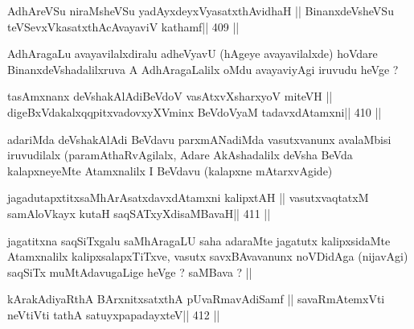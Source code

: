 \begin{shl}
\footnotemark[2]AdhAreVSu niraMsheVSu yadAyxdeyxVyasatxthAvidhaH ||
BinanxdeVsheVSu teVSevxVkasatxthAcAvayaviV kathamf\hfill || 409 ||
\end{shl}

\begin{artha}
AdhAragaLu avayavilalxdiralu adheVyavU (hAgeye avayavilalxde) hoVdare BinanxdeVshadalilxruva A AdhAragaLalilx oMdu avayaviyAgi iruvudu heVge ?
\end{artha}

\begin{shl}
tasAmxnanx deVshakAlAdiBeVdoV vasAtxvXsharxyoV miteVH ||
digeBxVdakalxqqpitxvadovxyXVminx BeVdoV\s yaM tadavxdAtamxni\hfill || 410 ||
\end{shl}

\begin{artha}
adariMda deVshakAlAdi BeVdavu parxmANadiMda vasutxvanunx avalaMbisi iruvudilalx (paramAthaRvAgilalx, Adare AkAshadalilx deVsha BeVda kalapxneyeMte Atamxnalilx I BeVdavu (kalapxne mAtarxvAgide)
\end{artha}

\begin{shl}
jagadutapxtitxsaMhArAsatxdavxdAtamxni kalipxtAH ||
vasutxvaqtatxM samAloVkayx kutaH saqSATxyXdisaMBavaH\hfill || 411 ||
\end{shl}

\begin{artha}
jagatitxna saqSiTxgalu saMhAragaLU saha adaraMte jagatutx kalipxsidaMte Atamxnalilx kalipxsalapxTiTxve, vasutx savxBAvavanunx noVDidAga (nijavAgi) saqSiTx muMtAdavugaLige heVge ? saMBava ? ||
\end{artha}

\begin{shl}
kArakAdiyaRthA BArxnitxsatxthA pUvaRmavAdiSamf ||
savaRmAtemxVti neVtiVti tathA satuyxpapadayxteV\hfill || 412 ||
\end{shl}

